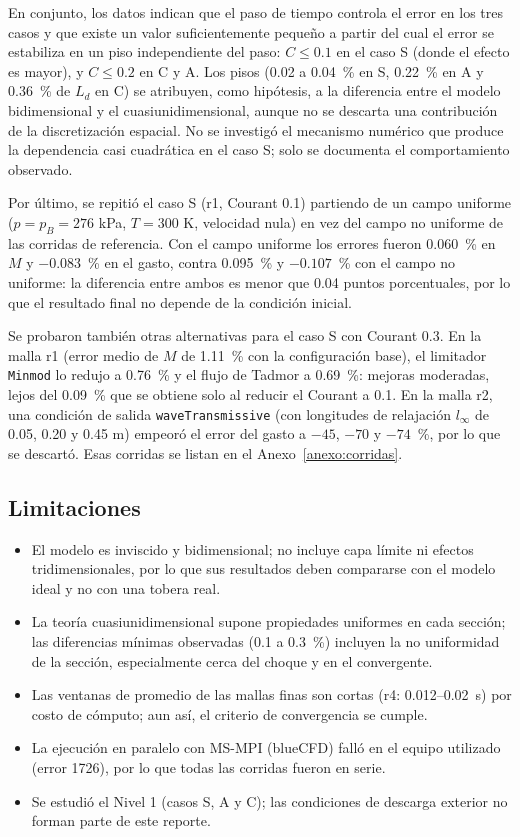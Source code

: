 \documentclass[12pt,letterpaper]{article}
\numberwithin{equation}{section}
\begin{document}
En conjunto, los datos indican que el paso de tiempo controla el error en los tres casos y que existe un valor suficientemente pequeño a partir del cual el error se estabiliza en un piso independiente del paso: $C\leq0.1$ en el caso S (donde el efecto es mayor), y $C\leq0.2$ en C y A. Los pisos (0.02 a 0.04~\% en S, 0.22~\% en A y 0.36~\% de $L_d$ en C) se atribuyen, como hipótesis, a la diferencia entre el modelo bidimensional y el cuasiunidimensional, aunque no se descarta una contribución de la discretización espacial. No se investigó el mecanismo numérico que produce la dependencia casi cuadrática en el caso S; solo se documenta el comportamiento observado.

Por último, se repitió el caso S (r1, Courant 0.1) partiendo de un campo uniforme ($p=p_B=276$ kPa, $T=300$ K, velocidad nula) en vez del campo no uniforme de las corridas de referencia. Con el campo uniforme los errores fueron 0.060~\% en $M$ y $-0.083$~\% en el gasto, contra 0.095~\% y $-0.107$~\% con el campo no uniforme: la diferencia entre ambos es menor que 0.04 puntos porcentuales, por lo que el resultado final no depende de la condición inicial.

Se probaron también otras alternativas para el caso S con Courant 0.3. En la malla r1 (error medio de $M$ de 1.11~\% con la configuración base), el limitador \texttt{Minmod} lo redujo a 0.76~\% y el flujo de Tadmor a 0.69~\%: mejoras moderadas, lejos del 0.09~\% que se obtiene solo al reducir el Courant a 0.1. En la malla r2, una condición de salida \texttt{waveTransmissive} (con longitudes de relajación $l_\infty$ de 0.05, 0.20 y 0.45 m) empeoró el error del gasto a $-45$, $-70$ y $-74$~\%, por lo que se descartó. Esas corridas se listan en el Anexo~\ref{anexo:corridas}.

\subsection{Limitaciones}

\begin{itemize}
  \item El modelo es inviscido y bidimensional; no incluye capa límite ni efectos tridimensionales, por lo que sus resultados deben compararse con el modelo ideal y no con una tobera real.
  \item La teoría cuasiunidimensional supone propiedades uniformes en cada sección; las diferencias mínimas observadas (0.1 a 0.3~\%) incluyen la no uniformidad de la sección, especialmente cerca del choque y en el convergente.
  \item Las ventanas de promedio de las mallas finas son cortas (r4: 0.012--0.02~s) por costo de cómputo; aun así, el criterio de convergencia se cumple.
  \item La ejecución en paralelo con MS-MPI (blueCFD) falló en el equipo utilizado (error 1726), por lo que todas las corridas fueron en serie.
  \item Se estudió el Nivel 1 (casos S, A y C); las condiciones de descarga exterior no forman parte de este reporte.
\end{itemize}
\end{document}
